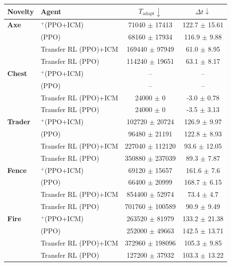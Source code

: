 \begin{table}[t]
\footnotesize
\centering
\begin{tabular}{l l c c}
\toprule
Novelty & Agent & $T_{\text{adapt}} \downarrow$ & $\Delta t \downarrow$ \\
\midrule

\textbf{Axe} & \RAPidLearn{}$^{+}$(PPO+ICM) & 71040 $\pm$ 17413 & 122.7 $\pm$ 15.61 \\
             & \RAPidLearn{} (PPO)          & 68160 $\pm$ 17934 & 116.9 $\pm$ 9.88 \\
             & Transfer RL (PPO)+ICM     & 169440 $\pm$ 97949 & 61.0 $\pm$ 8.95 \\
             & Transfer RL (PPO)         & 114240 $\pm$ 19651 & 63.1 $\pm$ 8.17 \\

\midrule
\textbf{Chest} & \RAPidLearn{}$^{+}$(PPO+ICM) & -- & -- \\
               & \RAPidLearn{} (PPO)          & -- & -- \\
               & Transfer RL (PPO)+ICM     & 24000 $\pm$ 0 & -3.0 $\pm$ 0.78 \\
               & Transfer RL (PPO)         & 24000 $\pm$ 0 & -3.5 $\pm$ 3.13 \\

\midrule
\textbf{Trader} & \RAPidLearn{}$^{+}$(PPO+ICM) & 102720 $\pm$ 20724 & 126.9 $\pm$ 9.97 \\
                & \RAPidLearn{} (PPO)          & 96480 $\pm$ 21191 & 122.8 $\pm$ 8.93 \\
                & Transfer RL (PPO)+ICM     & 227040 $\pm$ 112120 & 93.6 $\pm$ 12.05 \\
                & Transfer RL (PPO)         & 350880 $\pm$ 237039 & 89.3 $\pm$ 7.87 \\

\midrule
\textbf{Fence} & \RAPidLearn{}$^{+}$(PPO+ICM) & 69120 $\pm$ 15657 & 161.6 $\pm$ 7.6 \\
               & \RAPidLearn{} (PPO)          & 66400 $\pm$ 20999 & 168.7 $\pm$ 6.15 \\
               & Transfer RL (PPO)+ICM     & 854400 $\pm$ 52974 & 73.4 $\pm$ 4.7 \\
               & Transfer RL (PPO)         & 701760 $\pm$ 100589 & 90.9 $\pm$ 9.49 \\

\midrule
\textbf{Fire} & \RAPidLearn{}$^{+}$(PPO+ICM) & 263520 $\pm$ 81979 & 133.2 $\pm$ 21.38 \\
              & \RAPidLearn{} (PPO)          & 252000 $\pm$ 49663 & 142.5 $\pm$ 13.71 \\
              & Transfer RL (PPO)+ICM     & 372960 $\pm$ 198096 & 105.3 $\pm$ 9.85 \\
              & Transfer RL (PPO)         & 127200 $\pm$ 37932 & 103.3 $\pm$ 13.22 \\


\end{tabular}
\end{table}
